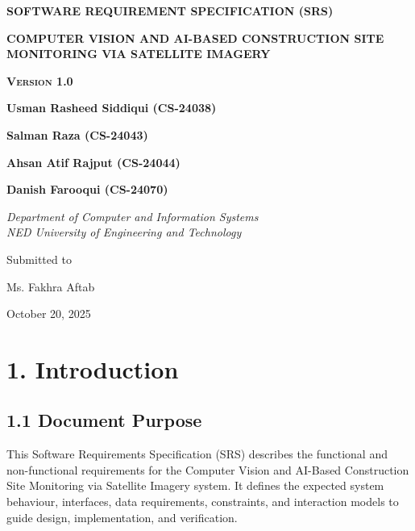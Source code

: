\documentclass[12pt,a4paper]{report}
\author{}
\date{}
\newcommand{\chapterlabel}{}
\begin{document}
\begin{titlepage}
 \centering
{\scshape\bfseries\LARGE SOFTWARE REQUIREMENT SPECIFICATION
(SRS) \par}
\vspace{1cm}
{\scshape\bfseries\huge COMPUTER VISION AND AI-BASED CONSTRUCTION SITE MONITORING VIA SATELLITE IMAGERY\par}
\vspace{1cm}
{\scshape\bfseries\huge Version 1.0 \par}
\vspace{1.2cm}
{\huge\bfseries Usman Rasheed Siddiqui (CS-24038) \par}
\vspace{1.2cm}
{\huge\bfseries Salman Raza (CS-24043) \par}
\vspace{1.2cm}
{\huge\bfseries Ahsan Atif Rajput (CS-24044) \par}
\vspace{1.2cm}
{\huge\bfseries Danish Farooqui (CS-24070) \par}
\vspace{1cm}
{\Large\itshape Department of Computer and Information Systems
\\ NED University of Engineering and Technology\par}
\vfill
Submitted to\par
Ms. Fakhra Aftab \textsc
\vfill
{\large October 20, 2025 \par}
\end{titlepage}
\newpage

{
\setcounter{tocdepth}{3}
\tableofcontents
}
\newpage

\vspace{5cm}
\renewcommand{\chapterlabel}{Chapter 1}
\chapter{1. Introduction}\label{introduction}

\section{1.1 Document Purpose}\label{document-purpose}

This Software Requirements Specification (SRS) describes the functional
and non-functional requirements for the Computer Vision and AI-Based
Construction Site Monitoring via Satellite Imagery system. It defines
the expected system behaviour, interfaces, data requirements,
constraints, and interaction models to guide design, implementation, and
verification.
\end{document}
